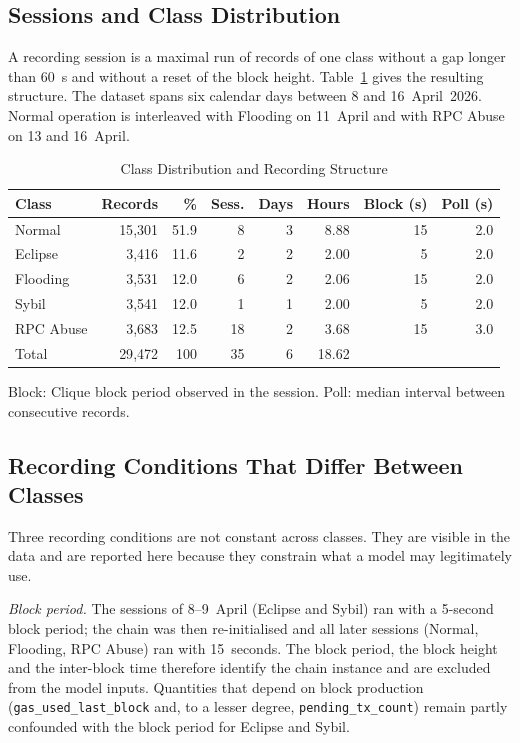 \documentclass[journal]{IEEEtran}
\newcommand{\code}[1]{\texttt{\small #1}}
\begin{document}
\subsection{Sessions and Class Distribution}
A recording session is a maximal run of records of one class without a gap longer than 60~s and without a reset of the block height. Table~\ref{tab:classes} gives the resulting structure. The dataset spans six calendar days between 8 and 16~April~2026. Normal operation is interleaved with Flooding on 11~April and with RPC Abuse on 13 and 16~April.

\begin{table}[t]
\caption{Class Distribution and Recording Structure}\label{tab:classes}
\centering\footnotesize
\setlength{\tabcolsep}{3.2pt}
\begin{tabular}{@{}lrrrrrrr@{}}
\toprule
Class & Records & \% & Sess. & Days & Hours & Block (s) & Poll (s) \\
\midrule
Normal & 15{,}301 & 51.9 & 8 & 3 & 8.88 & 15 & 2.0 \\
Eclipse & 3{,}416 & 11.6 & 2 & 2 & 2.00 & 5 & 2.0 \\
Flooding & 3{,}531 & 12.0 & 6 & 2 & 2.06 & 15 & 2.0 \\
Sybil & 3{,}541 & 12.0 & 1 & 1 & 2.00 & 5 & 2.0 \\
RPC Abuse & 3{,}683 & 12.5 & 18 & 2 & 3.68 & 15 & 3.0 \\
\midrule
Total & 29{,}472 & 100 & 35 & 6 & 18.62 & & \\
\bottomrule
\end{tabular}
\vspace{2pt}

{\raggedright\scriptsize Block: Clique block period observed in the session. Poll: median interval between consecutive records.\par}
\end{table}

\subsection{Recording Conditions That Differ Between Classes}\label{sec:conditions}
Three recording conditions are not constant across classes. They are visible in the data and are reported here because they constrain what a model may legitimately use.

\emph{Block period.} The sessions of 8--9~April (Eclipse and Sybil) ran with a 5-second block period; the chain was then re-initialised and all later sessions (Normal, Flooding, RPC Abuse) ran with 15~seconds. The block period, the block height and the inter-block time therefore identify the chain instance and are excluded from the model inputs. Quantities that depend on block production (\code{gas\_used\_last\_block} and, to a lesser degree, \code{pending\_tx\_count}) remain partly confounded with the block period for Eclipse and Sybil.
\end{document}
